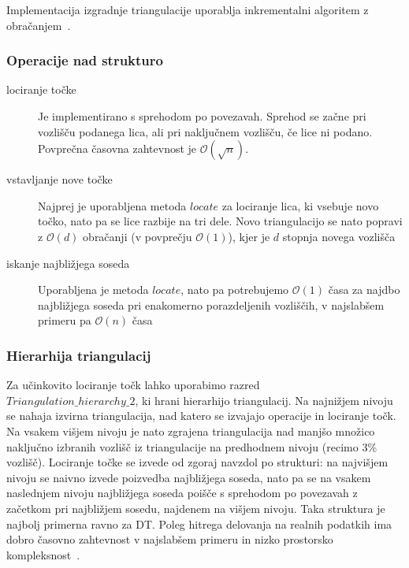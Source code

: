 \documentclass[a4paper, 12pt]{book}
\newcommand{\OO}{\ensuremath{\mathcal{O}}} %
\newcommand{\U}{\texttt{\_}}
\begin{document}
Implementacija izgradnje triangulacije uporablja inkrementalni algoritem z obračanjem~\cite{cgal:y-t2-16b}.

\subsubsection{Operacije nad strukturo}
\begin{description}
\item[lociranje točke] Je implementirano s sprehodom po povezavah. Sprehod se začne pri vozlišču podanega lica, ali pri naključnem vozlišču, če lice ni podano. Povprečna časovna zahtevnost je $\OO(\sqrt{n})$.
\item[vstavljanje nove točke] Najprej je uporabljena metoda $locate$ za lociranje lica, ki vsebuje novo točko, nato pa se lice razbije na tri dele. Novo triangulacijo se nato popravi z $\OO(d)$ obračanji (v povprečju $\OO(1)$), kjer je $d$ stopnja novega vozlišča
\item[iskanje najbližjega soseda] Uporabljena je metoda $locate$, nato pa potrebujemo $\OO(1)$ časa za najdbo najbližjega soseda pri enakomerno porazdeljenih vozliščih, v najslabšem primeru pa $\OO(n)$ časa
\end{description}

\subsubsection{Hierarhija triangulacij}
Za učinkovito lociranje točk lahko uporabimo razred \\$Triangulation\U hierarchy\U 2$, ki hrani hierarhijo triangulacij. Na najnižjem nivoju se nahaja izvirna triangulacija, nad katero se izvajajo operacije in lociranje točk. Na vsakem višjem nivoju je nato zgrajena triangulacija nad manjšo množico naključno izbranih vozlišč iz triangulacije na predhodnem nivoju (recimo 3\% vozlišč). Lociranje točke se izvede od zgoraj navzdol po strukturi: na najvišjem nivoju se naivno izvede poizvedba najbližjega soseda, nato pa se na vsakem naslednjem nivoju najbližjega soseda poišče s sprehodom po povezavah z začetkom pri najbližjem sosedu, najdenem na višjem nivoju. Taka struktura je najbolj primerna ravno za DT. Poleg hitrega delovanja na realnih podatkih ima dobro časovno zahtevnost v najslabšem primeru in nizko prostorsko kompleksnost~\cite{Olivier}.
\end{document}
